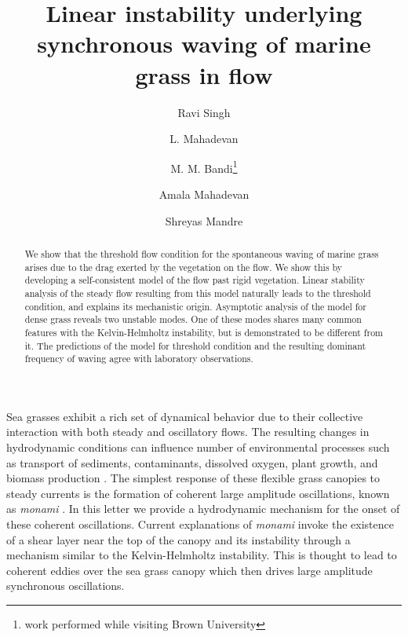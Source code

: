 \documentclass[aps,prl,twocolumn,superscriptaddress,10pt]{revtex4-1}  %
\newcommand{\monami}{\textit{monami }}
\begin{document}
\title{Linear instability underlying synchronous waving of marine grass in flow}
\author{Ravi Singh}
\author{L. Mahadevan}
\author{M. M. Bandi\thanks{work performed while visiting Brown University}}
\author{Amala Mahadevan}
\author{Shreyas Mandre}

\begin{abstract}
We show that the threshold flow condition for the spontaneous waving of marine grass arises due to the drag exerted by the vegetation on the flow. 
We show this by developing a self-consistent model of the flow past rigid vegetation. 
Linear stability analysis of the steady flow resulting from this model naturally leads to the threshold condition, and explains its mechanistic origin. 
Asymptotic analysis of the model for dense grass reveals two unstable modes. 
One of these modes shares many common features with the Kelvin-Helmholtz instability, but is demonstrated to be different from it. 
The predictions of the model for threshold condition and the resulting dominant frequency of waving agree with laboratory observations. 
\end{abstract}
\maketitle
Sea grasses exhibit a rich set of dynamical behavior due to their collective interaction with both steady and oscillatory flows.  
The resulting changes in hydrodynamic conditions can influence number of environmental processes such as transport of sediments, contaminants, dissolved oxygen, plant growth, and biomass production \cite{Fonseca87,Grizzle96,Nepf99,Nepf2012}. 
The simplest response of these flexible grass canopies to steady currents is the formation of coherent large amplitude oscillations, known as \monami \cite{AckermanOkubo93}.  
In this letter we provide a hydrodynamic mechanism for the onset of these coherent oscillations.
Current explanations of \monami invoke the existence of a shear layer near the top of the canopy \cite{Ghisal02,Raupach96} and its instability through a mechanism similar to the Kelvin-Helmholtz instability. 
This is thought to lead to coherent eddies over the sea grass canopy which then drives large amplitude synchronous oscillations.
\end{document}
